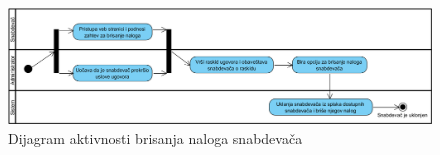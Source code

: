 \begin{figure}[H]
\begin{center}
\includegraphics[width=\textwidth]{Pictures/activity_supplier_delete.png}
\end{center}
    \caption{Dijagram aktivnosti brisanja naloga snabdevača}
\label{fig:ActivitySupplierContractTermination1}
\end{figure}
